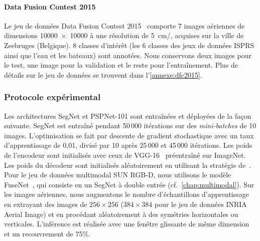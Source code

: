 \paragraph{Data Fusion Contest 2015}
Le jeu de données Data Fusion Contest 2015~\cite{campos-taberner_processing_2016} comporte 7 images aériennes de dimensions \num{10000x10000} à une résolution de  \SI{5}{\centi\meter/\px}, acquises sur la ville de Zeebruges (Belgique). 8 classes d'intérêt (les 6 classes des jeux de données \gls{ISPRS} ainsi que l'eau et les bateaux) sont annotées. Nous conservons deux images pour le test, une image pour la validation et le reste pour l'entraînement. Plus de détails sur le jeu de données se trouvent dans l'\cref{annexe:dfc2015}.

\subsubsection{Protocole expérimental}

Les architectures \gls{SegNet} et PSPNet-101 sont entraînées et déployées de la façon suivante. SegNet est entraîné pendant 50\,000 itérations sur des \emph{mini-batches} de 10 images. L'optimisation se fait par descente de gradient stochastique avec un taux d'apprentissage de 0,01, divisé par 10 après 25\,000 et 45\,000 itérations. Les poids de l'encodeur sont initialisés avec ceux de VGG-16~\cite{simonyan_very_2015} préentraîné sur ImageNet. Les poids du décodeur sont initialisés aléatoirement en utilisant la stratégie de~\citet{he_delving_2015}.
Pour le jeu de données multimodal SUN RGB-D, nous utilisons le modèle FuseNet~\cite{hazirbas_fusenet_2016}, qui consiste en un SegNet à double entrée (cf.~\cref{chap:multimodal}).
Sur les images aériennes, nous augmentons le nombre d'échantillons d'apprentissage en extrayant des images de $256\times256$ ($384\times384$ pour le jeu de données INRIA Aerial Image) et en procédant aléatoirement à des symétries horizontales ou verticales. L'inférence est réalisée avec une fenêtre glissante de même dimension et un recouvrement de 75\%.

